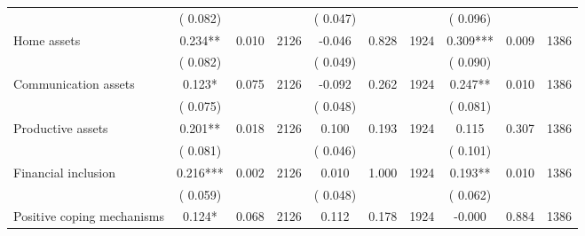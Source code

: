 \begin{tabular}{l*{9}{c}}
                               &        (       0.082) & &                                                                 &       (       0.047) & &                                                          &       (       0.096) & &  \\ 
 Home assets                 &              0.234**          &        0.010 & 2126          &             -0.046 &        0.828 & 1924                   &        0.309*** &        0.009 & 1386                 \\ 
                               &        (       0.082) & &                                                                 &       (       0.049) & &                                                          &       (       0.090) & &  \\ 
 Communication assets                 &              0.123*          &        0.075 & 2126          &             -0.092 &        0.262 & 1924                   &        0.247** &        0.010 & 1386                 \\ 
                               &        (       0.075) & &                                                                 &       (       0.048) & &                                                          &       (       0.081) & &   \\ 
 Productive assets                 &              0.201**          &        0.018 & 2126          &              0.100 &        0.193 & 1924                   &        0.115 &        0.307 & 1386                 \\ 
                               &        (       0.081) & &                                                                 &       (       0.046) & &                                                          &       (       0.101) & &   \\ 
 Financial inclusion                 &              0.216***          &        0.002 & 2126          &              0.010 &        1.000 & 1924                   &        0.193** &        0.010 & 1386                 \\ 
                               &        (       0.059) & &                                                                 &       (       0.048) & &                                                          &       (       0.062) & &  \\ 
 Positive coping mechanisms                &              0.124*        &        0.068 & 2126        &              0.112 &        0.178 & 1924               &       -0.000 &        0.884 & 1386       \\ 

\end{tabular}

